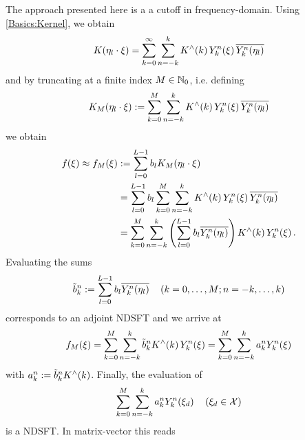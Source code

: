 The approach presented here is a a cutoff in frequency-domain. Using \eqref{Basics:Kernel}, we obtain
\[
  K{\hspace{-0.4ex}}\left(\mathbf{\eta}_{l} \cdot \mathbf{\xi}\right) = \sum_{k=0}^{\infty} \sum_{n=-k}^k K^{\wedge}{\hspace{-0.4ex}}\left(k\right) Y_{k}^n{\hspace{-0.4ex}}\left(\mathbf{\xi}\right) \overline{Y_{k}^n{\hspace{-0.4ex}}\left(\mathbf{\eta}_{l}\right)}
\]
and by truncating at a finite index $M \in \mathbb{N}_{0}$, i.e. defining
\begin{equation}
  \label{Applications:TruncatedSeries}
  K_{M}{\hspace{-0.4ex}}\left(\mathbf{\eta}_{l} \cdot \mathbf{\xi}\right) := 
  \sum_{k=0}^{M} \sum_{n=-k}^k K^{\wedge}{\hspace{-0.4ex}}\left(k\right) Y_{k}^n{\hspace{-0.4ex}}\left(\mathbf{\xi}\right) \overline{Y_{k}^n{\hspace{-0.4ex}}\left(\mathbf{\eta}_{l}\right)}
\end{equation}
we obtain
\begin{equation}
  \nonumber
  \begin{split}
    f{\hspace{-0.4ex}}\left(\xi\right) \approx f_{M}{\hspace{-0.4ex}}\left(\xi\right) & := \sum_{l = 0}^{L-1} b_{l} K_{M}{\hspace{-0.4ex}}\left(\mathbf{\eta}_{l} \cdot \mathbf{\xi}\right) \\
                 &       = \sum_{l = 0}^{L-1} b_{l} \sum_{k=0}^{M} \sum_{n=-k}^k K^{\wedge}{\hspace{-0.4ex}}\left(k\right)
                           Y_{k}^n{\hspace{-0.4ex}}\left(\mathbf{\xi}\right) \overline{Y_{k}^n{\hspace{-0.4ex}}\left(\mathbf{\eta}_{l}\right)} \\
                 &       = \sum_{k=0}^{M} \sum_{n=-k}^k \left(\sum_{l = 0}^{L-1} b_{l}
                           \overline{Y_{k}^n{\hspace{-0.4ex}}\left(\mathbf{\eta}_{l}\right)}\right) K^{\wedge}{\hspace{-0.4ex}}\left(k\right) Y_{k}^n{\hspace{-0.4ex}}\left(\mathbf{\xi}\right).
  \end{split}                           
\end{equation}
Evaluating the sums
\begin{equation}
\label{Applications:AdjointNDSFT}
  \tilde{b}_{k}^n := \sum_{l = 0}^{L-1} b_{l} \overline{Y_{k}^n{\hspace{-0.4ex}}\left(\mathbf{\eta}_{l}\right)} \quad \left(k = 0,\ldots,M; n = -k,\ldots,k\right)
\end{equation}
corresponds to an adjoint NDSFT and we arrive at
\[
  f_{M}{\hspace{-0.4ex}}\left(\xi\right) = \sum_{k=0}^{M} \sum_{n=-k}^k \tilde{b}_{k}^n K^{\wedge}{\hspace{-0.4ex}}\left(k\right)
                     Y_{k}^n{\hspace{-0.4ex}}\left(\mathbf{\xi}\right) = \sum_{k=0}^{M} \sum_{n=-k}^k a_{k}^n
                     Y_{k}^n{\hspace{-0.4ex}}\left(\mathbf{\xi}\right)
\]
with $a_{k}^n := \tilde{b}_{k}^n K^{\wedge}{\hspace{-0.4ex}}\left(k\right)$. Finally, the evaluation of
\begin{equation}
\label{Applications:NDSFT}
  \sum_{k=0}^{M} \sum_{n=-k}^k a_{k}^n Y_{k}^n{\hspace{-0.4ex}}\left(\mathbf{\xi}_{d}\right) \quad \left(\mathbf{\xi}_{d} \in \mathcal{X}\right)
\end{equation}
is a NDSFT. In matrix-vector this reads
